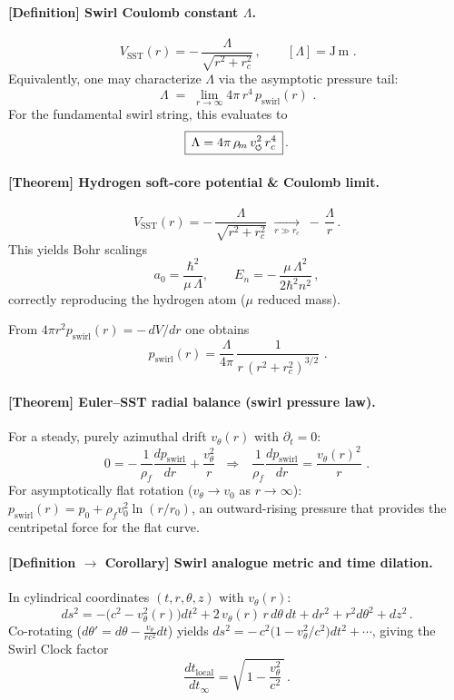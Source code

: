 \documentclass[11pt]{article}
\newcommand{\swirlarrow}{%
     \mathchoice{\mkern-2mu\scriptstyle\boldsymbol{\circlearrowleft}}%
                {\mkern-2mu\scriptstyle\boldsymbol{\circlearrowleft}}%
                {\mkern-2mu\scriptscriptstyle\boldsymbol{\circlearrowleft}}%
                {\mkern-2mu\scriptscriptstyle\boldsymbol{\circlearrowleft}}%
}
\newcommand{\vscore}{v_{\swirlarrow}}                    %
\newcommand{\rhof}{\rho_{\!f}}                           %
\newcommand{\rhom}{\rho_{\!m}}                           %
\newcommand{\rc}{r_c}                                    %
\begin{document}
\paragraph{[Definition] Swirl Coulomb constant $\Lambda$.}
    \[
        \boxed{\,V_{\text{SST}}(r)=-\,\frac{\Lambda}{\sqrt{r^2+\rc^2}}\,,\qquad [\Lambda]=\mathrm{J\,m}\,}\,.
    \]
    Equivalently, one may characterize $\Lambda$ via the asymptotic pressure tail:
    \[
        \boxed{\,\Lambda\;=\;\lim_{r\to\infty}4\pi\,r^{4}\,p_{\text{swirl}}(r)\,}\,.
    \]
    For the fundamental swirl string, this evaluates to
    \[
        \boxed{\,\Lambda = 4\pi\,\rhom\,\vscore^2\,\rc^4\,}\,.
    \]


\paragraph{[Theorem] Hydrogen soft-core potential \& Coulomb limit.}
    \[
        V_{\text{SST}}(r)=-\,\frac{\Lambda}{\sqrt{r^2+\rc^2}}
        \;\xrightarrow[r\gg \rc]{}\;
        -\,\frac{\Lambda}{r}\,.
    \]
    This yields Bohr scalings
    \[
        a_0=\frac{\hbar^2}{\mu\,\Lambda}, \qquad E_n=-\,\frac{\mu\,\Lambda^2}{2\hbar^2 n^2}\,,
    \]
    correctly reproducing the hydrogen atom ($\mu$ reduced mass).

    From $4\pi r^2 p_{\text{swirl}}(r)=-\,dV/dr$ one obtains
    \[
        \boxed{\,p_{\text{swirl}}(r)=\frac{\Lambda}{4\pi}\,\frac{1}{r\,(r^2+\rc^2)^{3/2}}\,}\,.
    \]


\paragraph{[Theorem] Euler–SST radial balance (swirl pressure law).}
    For a steady, purely azimuthal drift $v_\theta(r)$ with $\partial_t=0$:
    \[
        0=-\,\frac{1}{\rhof}\frac{dp_{\text{swirl}}}{dr}+\frac{v_\theta^2}{r}
        \;\;\Rightarrow\;\;
        \boxed{\,\frac{1}{\rhof}\frac{dp_{\text{swirl}}}{dr}=\frac{v_\theta(r)^2}{r}\,}\,.
    \]
    For asymptotically flat rotation ($v_\theta\to v_0$ as $r\to\infty$): $p_{\text{swirl}}(r)=p_0+\rhof v_0^2 \ln(r/r_0)$, an outward-rising pressure that provides the centripetal force for the flat curve.

\paragraph{[Definition $\to$ Corollary] Swirl analogue metric and time dilation.}
    In cylindrical coordinates $(t,r,\theta,z)$ with $v_\theta(r)$:
    \[
        ds^2 = -\big(c^2 - v_\theta^2(r)\big)dt^2 + 2\,v_\theta(r)\,r\,d\theta\,dt + dr^2 + r^2 d\theta^2 + dz^2\,.
    \]
    Co-rotating ($d\theta' = d\theta - \frac{v_\theta}{r c^2} dt$) yields $ds^2=-\,c^2\big(1 - v_\theta^2/c^2\big)dt^2+\cdots$, giving the Swirl Clock factor
    \[
        \frac{dt_{\text{local}}}{dt_{\infty}} = \sqrt{\,1-\frac{v_\theta^2}{c^2}\,}\,.
    \]
\end{document}
